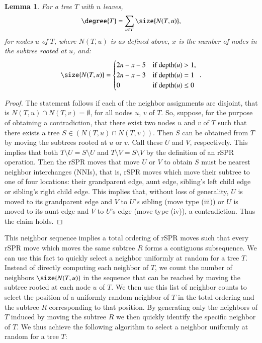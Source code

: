\documentclass[]{elsarticle}
\newtheorem{lem}[thm]{Lemma}
\begin{document}
\begin{lem}
	\label{lem:compute_degree}
	For a tree $T$ with $n$ leaves,
	$$\degree{T} = \sum_{u \in T} \size{N(T,u)},$$
	for nodes $u$ of $T$, where $N(T,u)$ is as defined above, $x$ is the number of nodes in the subtree rooted at $u$, and:
	$$\size{N(T,u)} = \begin{cases}
		2n - x - 5 &\text{if depth($u$) $ > 1$, } \\
		2n - x - 3 &\text{if depth($u$) $ = 1$ } \\
		0 &\text{if depth($u$) $ \le 0$ } \\
	\end{cases}.$$
\end{lem}
\begin{proof}
	The statement follows if each of the neighbor assignments are disjoint, that is $N(T,u) \cap N(T,v) = \emptyset$, for all nodes $u$, $v$ of $T$.
	So, suppose, for the purpose of obtaining a contradiction, that there exist two nodes $u$ and $v$ of $T$ such that there exists a tree $S \in (N(T,u) \cap N(T,v))$.
	Then $S$ can be obtained from $T$ by moving the subtrees rooted at $u$ or $v$.
	Call these $U$ and $V$, respectively.
	This implies that both $T \setminus U = S \setminus U$ and $T \setminus V = S \setminus V$ by the definition of an rSPR operation.
	Then the rSPR moves that move $U$ or $V$ to obtain $S$ must be nearest neighbor interchanges (NNIs), that is, rSPR moves which move their subtree to one of four locations: their grandparent edge, aunt edge, sibling's left child edge or sibling's right child edge.
	This implies that, without loss of generality, $U$ is moved to its grandparent edge and $V$ to $U's$ sibling (move type (iii)) or $U$ is moved to its aunt edge and $V$ to $U$'s edge (move type (iv)), a contradiction.
	Thus the claim holds.
\end{proof}



This neighbor sequence implies a total ordering of rSPR moves such that every rSPR move which moves the same subtree $R$ forms a contiguous subsequence.
We can use this fact to quickly select a neighbor uniformly at random for a tree $T$.
Instead of directly computing each neighbor of $T$, we count the number of neighbors $\size{N(T,u)}$ in the sequence that can be reached by moving the subtree rooted at each node $u$ of $T$.
We then use this list of neighbor counts to select the position of a uniformly random neighbor of $T$ in the total ordering and the subtree $R$ corresponding to that position.
By generating only the neighbors of $T$ induced by moving the subtree $R$ we then quickly identify the specific neighbor of $T$.
We thus achieve the following algorithm to select a neighbor uniformly at random for a tree $T$:
\end{document}
